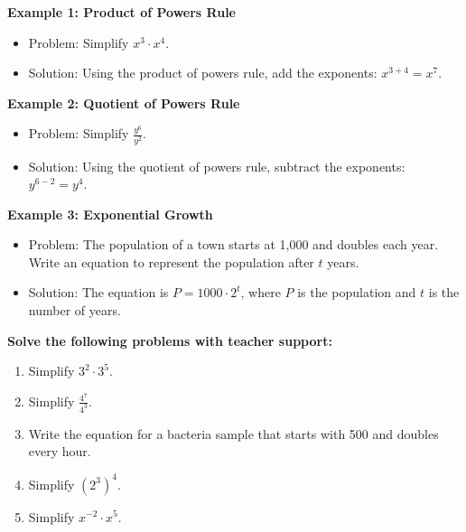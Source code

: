 \documentclass[12pt]{article}
\begin{document}
\vspace{1em}

\begin{tcolorbox}[colframe=black!60, colback=white, 
coltitle=black, colbacktitle=black!15, fonttitle=\bfseries\Large, 
title=Examples, halign title=center, left=10pt, right=10pt, top=10pt, bottom=15pt]
\textbf{Example 1: Product of Powers Rule}
\begin{itemize}
    \item Problem: Simplify \( x^3 \cdot x^4 \).
    \item Solution: Using the product of powers rule, add the exponents: \( x^{3+4} = x^7 \).
\end{itemize}

\textbf{Example 2: Quotient of Powers Rule}
\begin{itemize}
    \item Problem: Simplify \( \frac{y^6}{y^2} \).
    \item Solution: Using the quotient of powers rule, subtract the exponents: \( y^{6-2} = y^4 \).
\end{itemize}

\textbf{Example 3: Exponential Growth}
\begin{itemize}
    \item Problem: The population of a town starts at 1,000 and doubles each year. Write an equation to represent the population after \(t\) years.
    \item Solution: The equation is \( P = 1000 \cdot 2^t \), where \(P\) is the population and \(t\) is the number of years.
\end{itemize}
\end{tcolorbox}

\vspace{1em}

\begin{tcolorbox}[colframe=black!60, colback=white, 
coltitle=black, colbacktitle=black!15, fonttitle=\bfseries\Large, 
title=Guided Practice, halign title=center, left=10pt, right=10pt, top=10pt, bottom=15pt]
\textbf{Solve the following problems with teacher support:}
\begin{enumerate}[itemsep=5em]
    \item Simplify \( 3^2 \cdot 3^5 \).
    \item Simplify \( \frac{4^7}{4^3} \).
    \item Write the equation for a bacteria sample that starts with 500 and doubles every hour.
    \item Simplify \( (2^3)^4 \).
    \item Simplify \( x^{-2} \cdot x^5 \).
\end{enumerate}
\end{tcolorbox}
\end{document}
